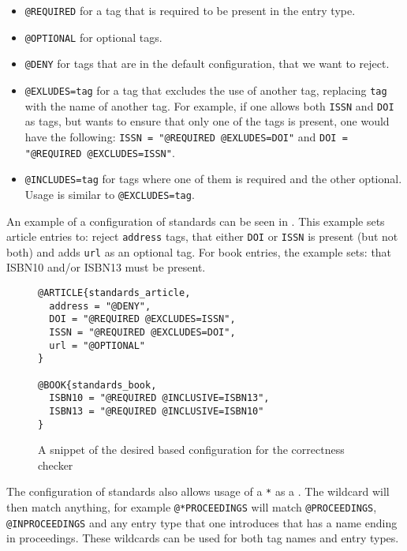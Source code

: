 \begin{itemize}
\item \texttt{@REQUIRED} for a tag that is required to be present in
  the entry type.
\item \texttt{@OPTIONAL} for optional tags.
\item \texttt{@DENY} for tags that are in the default configuration,
  that we want to reject.
\item \texttt{@EXLUDES=tag} for a tag that excludes the use of another
  tag, replacing \texttt{tag} with the name of another tag.  For
  example, if one allows both \texttt{ISSN} and \texttt{DOI} as tags,
  but wants to ensure that only one of the tags is present, one would
  have the following: \texttt{ISSN = "@REQUIRED @EXLUDES=DOI"} and
  \texttt{DOI = "@REQUIRED @EXCLUDES=ISSN"}.
\item \texttt{@INCLUDES=tag} for tags where one of them is required
  and the other optional.  Usage is similar to \texttt{@EXCLUDES=tag}.
\end{itemize}

An example of a configuration of standards can be seen in
.  This example sets article
entries to: reject \texttt{address} tags, that either \texttt{DOI} or
\texttt{ISSN} is present (but not both) and adds \texttt{url} as an
optional tag.  For book entries, the example sets: that ISBN10 and/or
ISBN13 must be present.

\begin{figure}
  \centering
\begin{verbatim}
@ARTICLE{standards_article,
  address = "@DENY",
  DOI = "@REQUIRED @EXCLUDES=ISSN",
  ISSN = "@REQUIRED @EXCLUDES=DOI",
  url = "@OPTIONAL"
}

@BOOK{standards_book,
  ISBN10 = "@REQUIRED @INCLUSIVE=ISBN13",
  ISBN13 = "@REQUIRED @INCLUSIVE=ISBN10"
}
\end{verbatim}
  \caption{A snippet of the desired {\bibtex} based configuration for
    the correctness checker}
  \label{fig:analyzing_standards_config}
\end{figure}

The configuration of standards also allows usage of a \texttt{*} as a
.  The wildcard will then match anything, for example
\texttt{@*PROCEEDINGS} will match \texttt{@PROCEEDINGS},
\texttt{@INPROCEEDINGS} and any entry type that one introduces that has
a name ending in proceedings.  These wildcards can be used for both
tag names and entry types.

